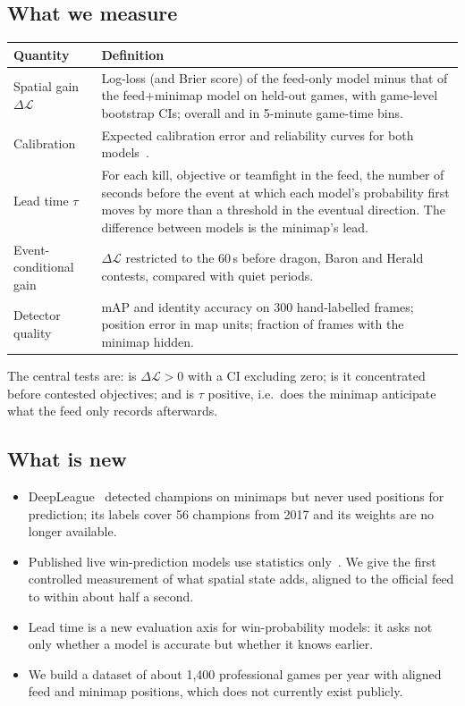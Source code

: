 \documentclass{article}
\begin{document}
\subsection{What we measure}
\begin{tabular}{@{}p{}p{}@{}}
\toprule
Quantity & Definition \\
\midrule
Spatial gain $\Delta\mathcal{L}$ & Log-loss (and Brier score) of the feed-only model minus that of the feed+minimap model on held-out games, with game-level bootstrap CIs; overall and in 5-minute game-time bins. \\
Calibration & Expected calibration error and reliability curves for both models~\cite{guo}. \\
Lead time $\tau$ & For each kill, objective or teamfight in the feed, the number of seconds before the event at which each model's probability first moves by more than a threshold in the eventual direction. The difference between models is the minimap's lead. \\
Event-conditional gain & $\Delta\mathcal{L}$ restricted to the 60\,s before dragon, Baron and Herald contests, compared with quiet periods. \\
Detector quality & mAP and identity accuracy on 300 hand-labelled frames; position error in map units; fraction of frames with the minimap hidden. \\
\bottomrule
\end{tabular}

The central tests are: is $\Delta\mathcal{L}>0$ with a CI excluding zero; is it concentrated before contested objectives; and is $\tau$ positive, i.e.\ does the minimap anticipate what the feed only records afterwards.

\subsection{What is new}
\begin{itemize}[leftmargin=*,itemsep=2pt]
  \item DeepLeague~\cite{deepleague} detected champions on minimaps but never used positions for prediction; its labels cover 56 champions from 2017 and its weights are no longer available.
  \item Published live win-prediction models use statistics only~\cite{hodge,yang}. We give the first controlled measurement of what spatial state adds, aligned to the official feed to within about half a second.
  \item Lead time is a new evaluation axis for win-probability models: it asks not only whether a model is accurate but whether it knows earlier.
  \item We build a dataset of about 1{,}400 professional games per year with aligned feed and minimap positions, which does not currently exist publicly.
\end{itemize}
\end{document}
